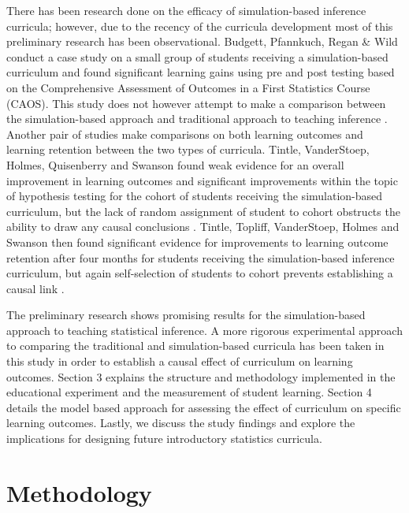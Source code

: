 There has been research done on the efficacy of simulation-based inference curricula; however, due to the recency of the curricula development most of this preliminary research has been observational.  Budgett, Pfannkuch, Regan \& Wild conduct a case study on a small group of students receiving a simulation-based curriculum and found significant learning gains using pre and post testing based on the Comprehensive Assessment of Outcomes in a First Statistics Course (CAOS).  This study does not however attempt to make a comparison between the simulation-based approach and traditional approach to teaching inference \citep{Budgett2013}. Another pair of studies make comparisons on both learning outcomes and learning retention between the two types of curricula. Tintle, VanderStoep, Holmes, Quisenberry and Swanson found weak evidence for an overall improvement in learning outcomes and significant improvements within the topic of hypothesis testing for the cohort of students receiving the simulation-based curriculum, but the lack of random assignment of student to cohort obstructs the ability to draw any causal conclusions \citep{Tintle2011}.  Tintle, Topliff, VanderStoep, Holmes and Swanson then found significant evidence for improvements to learning outcome retention after four months for students receiving the simulation-based inference curriculum, but again self-selection of students to cohort prevents establishing a causal link \citep{Tintle2012}.  

The preliminary research shows promising results for the simulation-based approach to teaching statistical inference.  A more rigorous experimental approach to comparing the traditional and simulation-based curricula has been taken in this study in order to establish a causal effect of curriculum on learning outcomes. Section 3 explains the structure and methodology implemented in the educational experiment and the measurement of student learning.  Section 4 details the model based approach for assessing the effect of curriculum on specific learning outcomes.  Lastly, we discuss the study findings and explore the implications for designing future introductory statistics curricula.
\section{Methodology}
\label{methods}

